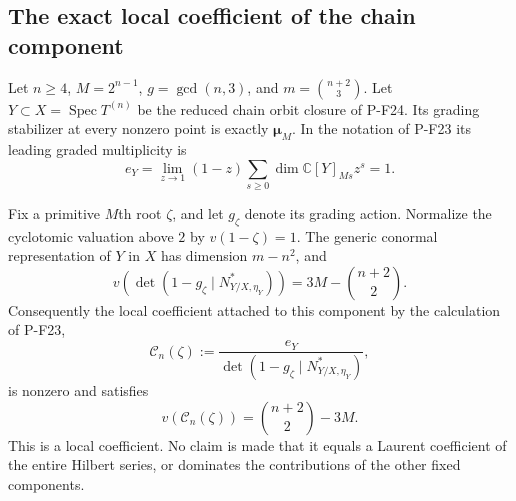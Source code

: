\subsection{The exact local coefficient of the chain component}

\begin{proposition}
\label{prop:chainlocalcoefficient}
Let $n\ge4$, $M=2^{n-1}$, $g=\gcd(n,3)$, and
$m=\binom{n+2}{3}$. Let $Y\subset X=\operatorname{Spec}T^{(n)}$
be the reduced chain orbit closure of P-F24. Its grading
stabilizer at every nonzero point is exactly
$\boldsymbol\mu_M$. In the notation of P-F23 its leading
graded multiplicity is
\[
 e_Y=\lim_{z\to1}(1-z)
           \sum_{s\ge0}\dim\mathbb C[Y]_{Ms}z^s=1.
 \tag{P-F28a}
\]

Fix a primitive $M$th root $\zeta$, and let $g_\zeta$
denote its grading action. Normalize the cyclotomic
valuation above $2$ by $v(1-\zeta)=1$. The generic
conormal representation of $Y$ in $X$ has dimension
$m-n^2$, and
\[
 v\!\left(\det(1-g_\zeta\mid N^*_{Y/X,\eta_Y})\right)
       =3M-\binom{n+2}{2}.
 \tag{P-F28b}
\]
Consequently the local coefficient attached to this
component by the calculation of P-F23,
\[
 \mathcal C_n(\zeta):=
   \frac{e_Y}{\det(1-g_\zeta\mid N^*_{Y/X,\eta_Y})},
\]
is nonzero and satisfies
\[
 v(\mathcal C_n(\zeta))=\binom{n+2}{2}-3M.
 \tag{P-F28c}
\]
This is a local coefficient. No claim is made that it
equals a Laurent coefficient of the entire Hilbert series,
or dominates the contributions of the other fixed components.
\end{proposition}

